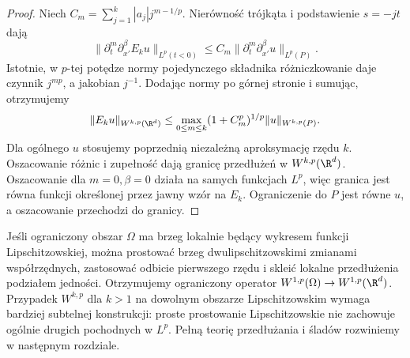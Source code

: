 \begin{proof}
Niech $C_m=\sum_{j=1}^k |a_j|j^{m-1/p}$.
Nierówność trójkąta i podstawienie $s=-jt$ dają
\[
 \|\partial_t^m\partial_{x'}^\beta E_ku\|_{L^p(t<0)}
 \le C_m\|\partial_t^m\partial_{x'}^\beta u\|_{L^p(P)}.
\]
Istotnie, w $p$-tej potędze normy pojedynczego składnika
różniczkowanie daje czynnik $j^{mp}$, a jakobian $j^{-1}$.
Dodając normy po górnej stronie i sumując, otrzymujemy
\[
 \|E_ku\|_{W^{k,p}(\R^d)}
 \le \max_{0\le m\le k}(1+C_m^p)^{1/p}
 \|u\|_{W^{k,p}(P)}.
\]
Dla ogólnego $u$ stosujemy poprzednią niezależną
aproksymację rzędu $k$. Oszacowanie różnic i zupełność
dają granicę przedłużeń w $W^{k,p}(\R^d)$.
Oszacowanie dla $m=0,\beta=0$ działa na samych
funkcjach $L^p$, więc granica jest równa funkcji
określonej przez jawny wzór na $E_k$. Ograniczenie do $P$
jest równe $u$, a oszacowanie przechodzi do granicy.
\end{proof}

\begin{uwaga}
Jeśli ograniczony obszar $\Omega$ ma brzeg lokalnie
będący wykresem funkcji Lipschitzowskiej, można prostować
brzeg dwulipschitzowskimi zmianami współrzędnych,
zastosować odbicie pierwszego rzędu i skleić lokalne
przedłużenia podziałem jedności. Otrzymujemy ograniczony
operator $W^{1,p}(\Omega)\to W^{1,p}(\R^d)$.
Przypadek $W^{k,p}$ dla $k>1$ na dowolnym obszarze Lipschitzowskim wymaga bardziej subtelnej konstrukcji:
proste prostowanie Lipschitzowskie nie zachowuje ogólnie
drugich pochodnych w $L^p$. Pełną teorię przedłużania
i śladów rozwiniemy w następnym rozdziale.
\end{uwaga}

